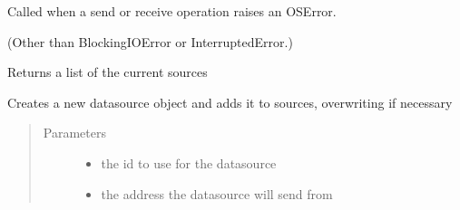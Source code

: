 \documentclass[letterpaper,10pt,english]{sphinxmanual}
\begin{document}
\begin{fulllineitems}
\begin{fulllineitems}
\end{fulllineitems}


\begin{fulllineitems}
\label{\detokenize{src.datasources:src.datasources.models.UdpReceiver.error_received}}
Called when a send or receive operation raises an OSError.

(Other than BlockingIOError or InterruptedError.)

\end{fulllineitems}


\begin{fulllineitems}
\label{\detokenize{src.datasources:src.datasources.models.UdpReceiver.get_sources}}
Returns a list of the current sources

\end{fulllineitems}


\begin{fulllineitems}
\label{\detokenize{src.datasources:src.datasources.models.UdpReceiver.set_source}}
Creates a new datasource object and adds it to sources, overwriting if necessary
\begin{quote}\begin{description}
\item[{Parameters}] \leavevmode\begin{itemize}
\item {} 
 \textendash{} the id to use for the datasource

\item {} 
 \textendash{} the address the datasource will send from


\end{itemize}
\end{description}
\end{quote}
\end{fulllineitems}
\end{fulllineitems}
\end{document}
